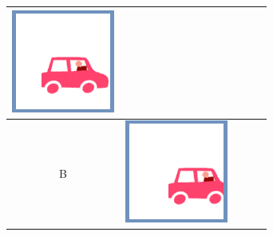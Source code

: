 \documentclass[12pt]{article}
\begin{document}
\begin{minipage}{\textwidth}
\begin{table}[H]
\begin{tabulary}{\linewidth}{|C|CCCC|}
				\vspace{0.01cm}\includegraphics[width=\linewidth]{option3}
				\\ \hline 
				B &
				\vspace{0.01cm}\includegraphics[width=\linewidth]{option4} &

\end{tabulary}
\end{table}
\end{minipage}
\end{document}
